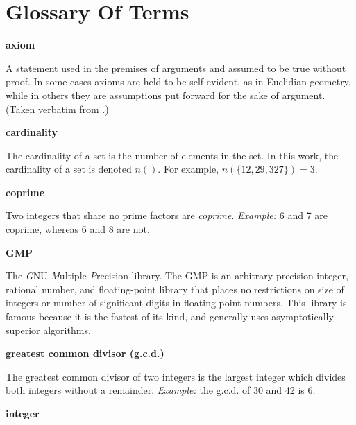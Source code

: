 \chapter*{Glossary Of Terms}

\label{cglo0}

\begin{vworktermglossaryenum}

\item \textbf{axiom}

      A statement used in the premises of arguments and assumed to be true
	  without proof.  In some cases axioms are held to be self-evident, as in 
	  Euclidian geometry, while in others they are assumptions put forward for
	  the sake of argument.
      (Taken verbatim from \cite{bibref:b:penguindictionaryofmathematics:2ded}.)

\item \textbf{cardinality}

      The cardinality of a set is the
      number of elements in the set.  In this work, the cardinality
      of a set is denoted $n()$.  For example, 
      $n(\{12,29,327\}) = 3$.

\item \textbf{coprime}

      Two integers that share no prime factors are \emph{coprime}.
      \emph{Example:}
      6 and 7 are coprime, whereas 6 and 8 are not.

\item \textbf{GMP}

      The \emph{G}NU \emph{M}ultiple \emph{P}recision library.
      The GMP is an arbitrary-precision integer, rational number,
      and floating-point library that places no restrictions on
      size of integers or number of significant digits in floating-point
      numbers.  This 
      library is famous because it is the fastest of its
      kind, and generally uses asymptotically superior algorithms.

\item \textbf{greatest common divisor (g.c.d.)}

      The greatest common divisor of two integers is the largest
      integer which divides both integers without a remainder.
      \emph{Example:} the g.c.d. of 30 and 42 is 6.

\item \textbf{integer}%


\end{vworktermglossaryenum}
